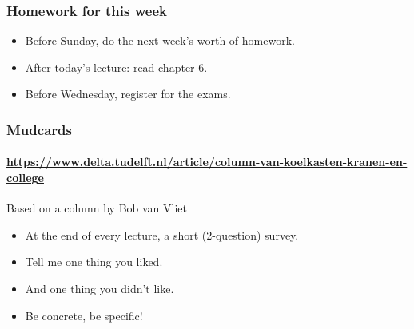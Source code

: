 
\begin{frame}
	\frametitle{Homework for this week}
	\begin{itemize}[<+->]
		\item \alert{Before} Sunday, do the next week's worth of homework.
		\item \alert{After} today's lecture: read chapter 6.
		\item \alert{Before Wednesday}, register for the exams.
	\end{itemize}
\end{frame}

\begin{frame}
	\frametitle{Mudcards}
	\framesubtitle{\url{https://www.delta.tudelft.nl/article/column-van-koelkasten-kranen-en-college}}

	\begin{block}{Based on a column by Bob van Vliet}
		\begin{itemize}
			\item At the end of every lecture, a short (2-question) survey.
			\item Tell me one thing you liked.
			\item And one thing you didn't like.
			\item Be concrete, be specific!
		\end{itemize}
	\end{block}
\end{frame}

